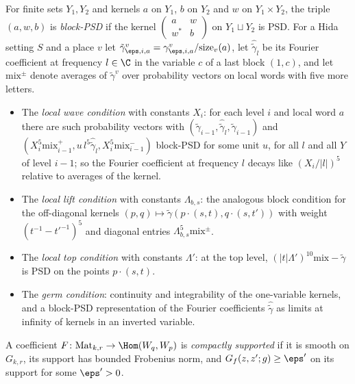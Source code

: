 \begin{definition}\label{pf:thmS-carrier:blockdef}
For finite sets $Y_1,Y_2$ and kernels $a$ on $Y_1$, $b$ on $Y_2$ and $w$ on $Y_1\times Y_2$, the triple $(a,w,b)$ is
\emph{block-PSD} if the kernel $\left(\begin{smallmatrix}a&w\\ w^*&b\end{smallmatrix}\right)$ on $Y_1\sqcup Y_2$ is PSD. For a
Hida setting $S$ and a place $v$ let $\tilde\gamma^v_{\eps,i,a}=\gamma^v_{\eps,i,a}/\mathrm{size}_v(a)$, let
$\widehat{\tilde\gamma}_l$ be its Fourier coefficient at frequency $l\in\C$ in the variable $c$ of a last block $(1,c)$, and let
$\mathrm{mix}^\pm$ denote averages of $\tilde\gamma^v$ over probability vectors on local words with five more letters.
\begin{itemize}
\item The \emph{local wave condition} with constants $X_i$: for each level $i$ and local word $a$ there are such probability
  vectors with $(\tilde\gamma_{i-1},\widehat{\tilde\gamma}_l,\tilde\gamma_{i-1})$ and $(X_i^5\mathrm{mix}^+_{i-1},u\,l^5
  \widehat{\tilde\gamma}_l,X_i^5\mathrm{mix}^-_{i-1})$ block-PSD for some unit $u$, for all $l$ and all $Y$ of level $i-1$; so
  the Fourier coefficient at frequency $l$ decays like $(X_i/|l|)^5$ relative to averages of the kernel.
\item The \emph{local lift condition} with constants $\Lambda_{b,s}$: the analogous block condition for the off-diagonal
  kernels $(p,q)\mapsto\tilde\gamma(p\cdot(s,t),q\cdot(s,t'))$ with weight $(t^{-1}-t'^{-1})^5$ and diagonal entries
  $\Lambda_{b,s}^5\mathrm{mix}^\pm$.
\item The \emph{local top condition} with constants $\Lambda'$: at the top level, $(|t|\Lambda')^{10}\mathrm{mix}-\tilde\gamma$
  is PSD on the points $p\cdot(s,t)$.
\item The \emph{germ condition}: continuity and integrability of the one-variable kernels, and a block-PSD representation of
  the Fourier coefficients $\widehat{\tilde\gamma}$ as limits at infinity of kernels in an inverted variable.
\end{itemize}
A coefficient $F\colon\mathrm{Mat}_{k,r}\to\Hom(W_q,W_p)$ is \emph{compactly supported} if it is smooth on $G_{k,r}$, its
support has bounded Frobenius norm, and $G_f(z,z';g)\ge\eps'$ on its support for some $\eps'>0$.
\end{definition}

